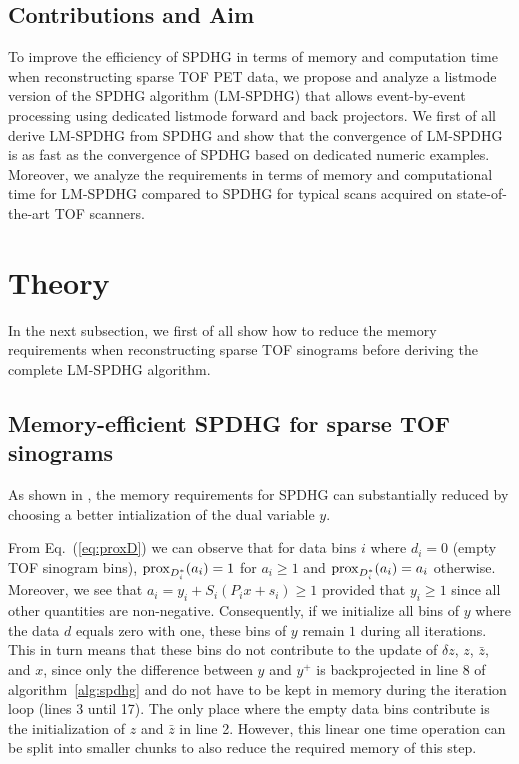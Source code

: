 \subsection*{Contributions and Aim}

To improve the efficiency of SPDHG in terms of memory and computation time when reconstructing 
sparse TOF PET data, we propose and analyze a listmode version of the SPDHG algorithm (LM-SPDHG) 
that allows event-by-event processing using dedicated listmode forward and back projectors.
We first of all derive LM-SPDHG from SPDHG and show that the convergence of LM-SPDHG is as 
fast as the convergence of SPDHG based on dedicated numeric examples.
Moreover, we analyze the requirements in terms of memory and computational time
for LM-SPDHG compared to SPDHG for typical scans acquired on state-of-the-art TOF scanners.


\section{Theory}

In the next subsection, we first of all show how to reduce the memory requirements
when reconstructing sparse TOF sinograms before deriving the complete LM-SPDHG algorithm.

\subsection*{Memory-efficient SPDHG for sparse TOF sinograms}

As shown in \cite{Schramm2021}, the memory requirements for SPDHG can substantially reduced by choosing
a better intialization of the dual variable $y$.

From Eq.~(\ref{eq:proxD}) we can observe that for data bins $i$ where $d_i = 0$ 
(empty TOF sinogram bins), $\operatorname{prox}_{D_i^*}(a_i) = 1$ for $a_i \geq 1$ and $\operatorname{prox}_{D_i^*}(a_i) = a_i$ 
otherwise. 
Moreover, we see that $ a_i = y_i + S_i (P_i x + s_i) \geq 1$ provided that $y_i \geq 1$ 
since all other quantities are non-negative. 
Consequently, if we initialize all bins of $y$ where the data $d$ equals zero with one, 
these bins of $y$ remain $1$ during all iterations. 
This in turn means that these bins do not contribute to the update of $\delta z$, $z$, $\bar{z}$, 
and $x$, since only the difference between
$y$ and $y^+$ is backprojected in line 8 of algorithm~\ref{alg:spdhg} and
do not have to be kept in memory during the iteration loop (lines 3 until 17). 
The only place where the empty data bins contribute is the initialization of $z$ and $\bar{z}$
in line 2.
However, this linear one time operation can be split into smaller chunks to also reduce
the required memory of this step.

